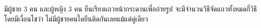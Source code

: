 ﻿%
\question มีผู้ชาย $3$ คน และผู้หญิง $3$ คน ยืนเรียงแถวหน้ากระดานเพื่อถ่ายรูป จะมีจำนวนวิธีจัดแถวทั้งหมดกี่วิธี โดยมีเงื่อนไขว่า ไม่มีผู้ชายคนใดยืนติดกันเลยแม้แต่คู่เดียว
\newline 
{}
